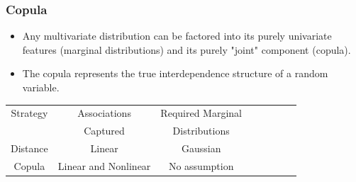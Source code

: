 \documentclass[pdf,9pt,xcolor=dvipsnames,hide notes]{beamer}
\begin{document}
\begin{frame}[label=frame4b]
	\frametitle{Copula}
	
	
	\begin{itemize}
	\justifying
		
		\item Any multivariate distribution can be factored into its purely univariate features (marginal distributions) and its purely "joint" component (copula).
		
		\pause
		\vspace{0.3cm}
		
		\item The copula represents the true interdependence structure of a random variable.
		
		\end{itemize}
		
		\pause
		\vspace{0.3cm}
			
		
		
		\pause
		\vspace{0.3cm}
		
		
		\begin{table}[ht]
			\centering
			\begin{tabular}{c|ccccccc}
				\hline
				\rowcolor{corn}
				Strategy & Associations & Required Marginal \\
				\rowcolor{corn}
				& Captured & Distributions \\
				\hline
				Distance& Linear & Gaussian \\
				Copula& Linear and Nonlinear & No assumption \\
				\hline
			\end{tabular}
		\end{table}
	

\end{frame}
\end{document}
